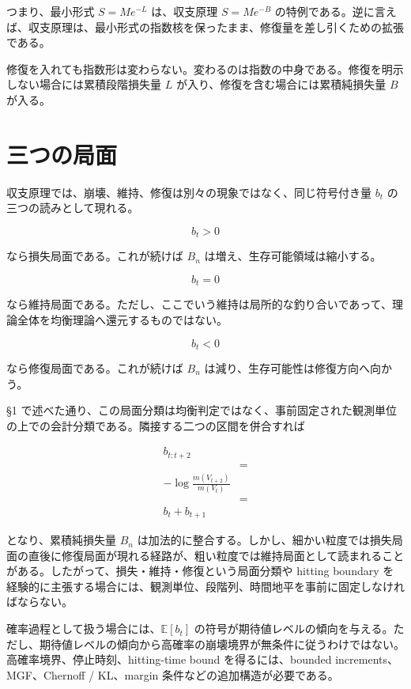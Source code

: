 \documentclass[12pt,a4paper]{article}
\begin{document}
つまり、最小形式 \(S=Me^{-L}\) は、収支原理 \(S=Me^{-B}\) の特例である。逆に言えば、収支原理は、最小形式の指数核を保ったまま、修復量を差し引くための拡張である。

修復を入れても指数形は変わらない。変わるのは指数の中身である。修復を明示しない場合には累積段階損失量 \(L\) が入り、修復を含む場合には累積純損失量 \(B\) が入る。

\section{三つの局面}\label{ux4e09ux3064ux306eux5c40ux9762}

収支原理では、崩壊、維持、修復は別々の現象ではなく、同じ符号付き量 \(b_{t}\) の三つの読みとして現れる。

\[
b_{t}>0
\]

なら損失局面である。これが続けば \(B_{n}\) は増え、生存可能領域は縮小する。

\[
b_{t}=0
\]

なら維持局面である。ただし、ここでいう維持は局所的な釣り合いであって、理論全体を均衡理論へ還元するものではない。

\[
b_{t}<0
\]

なら修復局面である。これが続けば \(B_{n}\) は減り、生存可能性は修復方向へ向かう。

§1 で述べた通り、この局面分類は均衡判定ではなく、事前固定された観測単位の上での会計分類である。隣接する二つの区間を併合すれば

\[
\begin{aligned}
b_{t:t+2} \\
&= \\
-\log \frac{m(V_{t+2})}{m(V_{t})} \\
&= \\
b_{t}+b_{t+1}
\end{aligned}
\]

となり、累積純損失量 \(B_{n}\) は加法的に整合する。しかし、細かい粒度では損失局面の直後に修復局面が現れる経路が、粗い粒度では維持局面として読まれることがある。したがって、損失・維持・修復という局面分類や hitting boundary を経験的に主張する場合には、観測単位、段階列、時間地平を事前に固定しなければならない。

確率過程として扱う場合には、\(\mathbb E[b_{t}]\) の符号が期待値レベルの傾向を与える。ただし、期待値レベルの傾向から高確率の崩壊境界が無条件に従うわけではない。高確率境界、停止時刻、hitting-time bound を得るには、bounded increments、MGF、Chernoff / KL、margin 条件などの追加構造が必要である。
\end{document}

